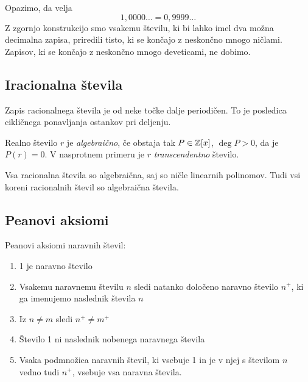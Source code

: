 \documentclass[12pt, a4paper]{article}
\begin{document}
Opazimo, da velja
\[
1,0000\ldots=0,9999\dots
\]
Z zgornjo konstrukcijo smo vsakemu številu, ki bi lahko imel dva možna decimalna zapisa, priredili tisto, ki se končajo z neskončno mnogo ničlami. Zapisov, ki se končajo z neskončno mnogo deveticami, ne dobimo.

\newpage

\subsection{Iracionalna števila}

Zapis racionalnega števila je od neke točke dalje periodičen. To je posledica cikličnega ponavljanja ostankov pri deljenju.

\begin{definicija}
Realno število $r$ je \emph{algebraično}, če obstaja tak $P\in\mathbb{Z}[x]$, $\deg P>0$, da je $P(r)=0$. V nasprotnem primeru je $r$ \emph{transcendentno} število.
\end{definicija}

\begin{posledica}
Vsa racionalna števila so algebraična, saj so ničle linearnih polinomov. Tudi vsi koreni racionalnih števil so algebraična števila.
\end{posledica}

\newpage

\subsection{Peanovi aksiomi}

\begin{okvir}
\begin{definicija}
Peanovi aksiomi naravnih števil:

\begin{enumerate}[label=P\arabic*.]
\item 1 je naravno število
\item Vsakemu naravnemu številu $n$ sledi natanko določeno naravno število $n^+$, ki ga imenujemo naslednik števila $n$
\item Iz $n\ne m$ sledi $n^+\ne m^+$
\item Število 1 ni naslednik nobenega naravnega števila
\item Vsaka podmnožica naravnih števil, ki vsebuje 1 in je v njej s številom $n$ vedno tudi $n^+$, vsebuje vsa naravna števila.
\end{enumerate}
\end{definicija}
\end{okvir}
\end{document}
